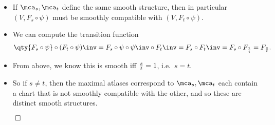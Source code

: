 \begin{itemize}
\tightlist
\item
  If \(\mca_s, \mca_t\) define the same smooth structure, then in
  particular \((V, F_s\circ \psi)\) must be smoothly compatible with
  \((V, F_t \circ \psi)\).
\item
  We can compute the transition function \begin{align*}
  \qty{F_s\circ \psi} \circ (F_t\circ \psi)\inv = F_s\circ \psi \circ \psi\inv \circ F_t\inv = F_s\circ F_t\inv = F_s \circ F_{1\over t} = F_{s\over t}
  .\end{align*}
\item
  From above, we know this is smooth iff \({s\over t} = 1\),
  i.e.~\(s=t\).
\item
  So if \(s\neq t\), then the maximal atlases correspond to
  \(\mca_s, \mca_t\) each contain a chart that is not smoothly
  compatible with the other, and so these are distinct smooth
  structures.
\end{itemize}

\(\qed\)

